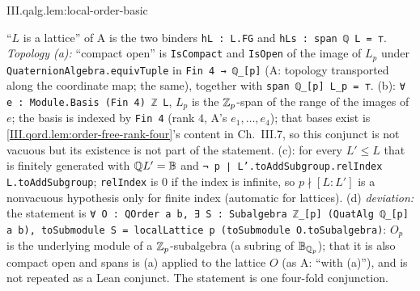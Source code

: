 \begin{lemma}
\end{lemma}
\begin{tfformal}{III.qalg.lem:local-order-basic}
\begin{tffidelity}
``$L$ is a lattice'' of A is the two binders \texttt{hL : L.FG} and \texttt{hLs : span ℚ L = ⊤}. \emph{Topology (a):} ``compact open'' is \texttt{IsCompact} and \texttt{IsOpen} of the image of $L_p$ under \texttt{QuaternionAlgebra.equivTuple} in \texttt{Fin 4 → ℚ\_[p]} (A: topology transported along the coordinate map; the same), together with \texttt{span ℚ\_[p] L\_p = ⊤}. (b): \texttt{∀ e : Module.Basis (Fin 4) ℤ L}, $L_p$ is the $\mathbb{Z}_p$-span of the range of the images of $e$; the basis is indexed by \texttt{Fin 4} (rank $4$, A's $e_1,\dots,e_4$); that bases exist is \cref{III.qord.lem:order-free-rank-four}'s content in Ch.~III.7, so this conjunct is not vacuous but its existence is not part of the statement. (c): for every $L'\le L$ that is finitely generated with $\mathbb{Q} L'=\mathbb{B}$ and \texttt{¬ p ∣ L'.toAddSubgroup.relIndex L.toAddSubgroup}; \texttt{relIndex} is $0$ if the index is infinite, so $p\nmid[L:L']$ is a nonvacuous hypothesis only for finite index (automatic for lattices). (d) \emph{deviation:} the statement is \texttt{∀ O : QOrder a b, ∃ S : Subalgebra ℤ\_[p] (QuatAlg ℚ\_[p] a b), toSubmodule S = localLattice p (toSubmodule O.toSubalgebra)}: $O_p$ is the underlying module of a $\mathbb{Z}_p$-subalgebra (a subring of $\mathbb{B}_{\mathbb{Q}_p}$); that it is also compact open and spans is (a) applied to the lattice $O$ (as A: ``with (a)''), and is not repeated as a Lean conjunct. The statement is one four-fold conjunction.
\end{tffidelity}
\end{tfformal}
